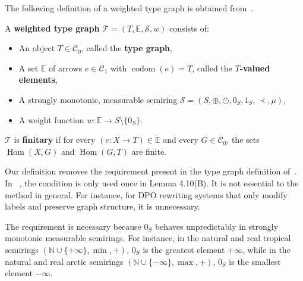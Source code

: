 The following definition of a weighted type graph is obtained from~\cite[Def. 3.1]{endrullis2024generalized}.
\begin{definition}
    \label{def:weighted_type_graph}
    A \textbf{weighted type graph} \(\mathcal{T} = (T, \mathbb{E}, \mathcal{S}, w)\) consists of: 
    \begin{itemize} 
        \item An object \(T \in \mathcal{C}_0\), called the \textbf{type graph},
        \item A set \(\mathbb{E}\) of arrows \(e \in \mathcal{C}_1\) with \(\operatorname{codom}(e) = T\), called the \textbf{\(T\)-valued elements}, 
        \item A strongly monotonic, measurable semiring \(\mathcal{S}=(S, \oplus, \odot, 0_S, 1_S, \prec, \mu)\),
        \item A weight function \(w : \mathbb{E} \to S \setminus \{0_S\}\).
    \end{itemize}
    \(\mathcal{T}\) is \textbf{finitary} if for every \((e:X \to T) \in \mathbb{E}\) and every \(G \in \mathcal{C}_0\), the sets \(\operatorname{Hom}(X, G)\) and \(\operatorname{Hom}(G, T)\) are finite.
\end{definition}
\begin{remark}
    \label{remark:greater_than_1}
    Our definition removes the requirement  present in the type graph definition of~\cite{endrullis2024generalized}. In ~\cite{endrullis2024generalized}, the condition is only used 
    once in Lemma 4.10(B).
    It is not essential to the method in general. For instance, for DPO rewriting systems that only modify labels and preserve graph structure, it is unnecessary.
\end{remark} 
\begin{remark}
    \label{remark:semiring_0_unpredictable}
    The requirement  is necessary because \(0_S\) behaves unpredictably in strongly monotonic measurable semirings. For instance, in the natural and real tropical semirings \((\mathbb{N} \cup \{+\infty\}, \min, +)\), \(0_S\) is the greatest element \(+\infty\), while in the natural and real arctic semirings \((\mathbb{N} \cup \{-\infty\}, \max, +)\), \(0_S\) is the smallest element \(-\infty\).
\end{remark} 
